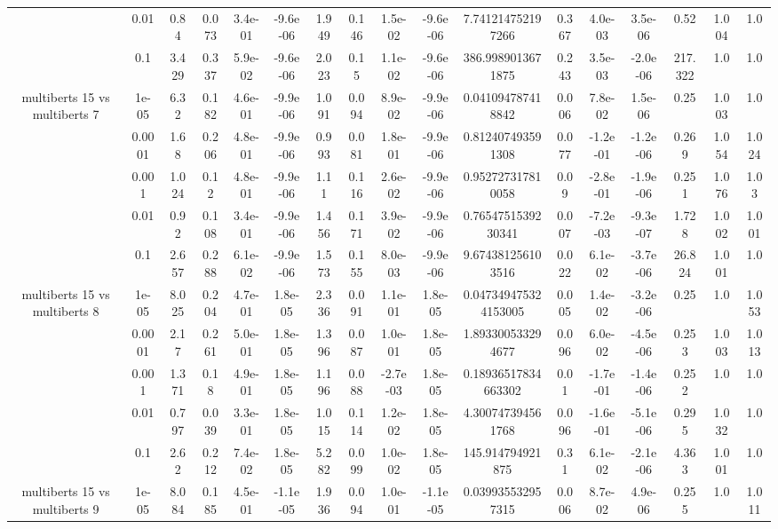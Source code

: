 \begin{tabular}{|c|c|c|c|c|c|c|c|c|c|c|c|c|c|c|c|c|}
 & 0.01 & 0.84 & 0.073 & 3.4e-01 & -9.6e-06 & 1.949 & 0.146 & 1.5e-02 & -9.6e-06 & 7.741214752197266 & 0.367 & 4.0e-03 & 3.5e-06 & 0.52 & 1.004 & 1.0 \\
 & 0.1 & 3.429 & 0.337 & 5.9e-02 & -9.6e-06 & 2.023 & 0.15 & 1.1e-02 & -9.6e-06 & 386.9989013671875 & 0.243 & 3.5e-03 & -2.0e-06 & 217.322 & 1.0 & 1.0 \\
\hline
\multirow{5}{*}{multiberts 15 vs multiberts 7} & 1e-05 & 6.32 & 0.182 & 4.6e-01 & -9.9e-06 & 1.091 & 0.094 & 8.9e-02 & -9.9e-06 & 0.041094787418842 & 0.006 & 7.8e-02 & 1.5e-06 & 0.25 & 1.003 & 1.0 \\
 & 0.0001 & 1.68 & 0.206 & 4.8e-01 & -9.9e-06 & 0.993 & 0.081 & 1.8e-01 & -9.9e-06 & 0.812407493591308 & 0.077 & -1.2e-01 & -1.2e-06 & 0.269 & 1.054 & 1.024 \\
 & 0.001 & 1.024 & 0.12 & 4.8e-01 & -9.9e-06 & 1.11 & 0.116 & 2.6e-02 & -9.9e-06 & 0.952727317810058 & 0.09 & -2.8e-01 & -1.9e-06 & 0.251 & 1.076 & 1.03 \\
 & 0.01 & 0.92 & 0.108 & 3.4e-01 & -9.9e-06 & 1.456 & 0.171 & 3.9e-02 & -9.9e-06 & 0.7654751539230341 & 0.007 & -7.2e-03 & -9.3e-07 & 1.728 & 1.002 & 1.001 \\
 & 0.1 & 2.657 & 0.288 & 6.1e-02 & -9.9e-06 & 1.573 & 0.155 & 8.0e-03 & -9.9e-06 & 9.674381256103516 & 0.022 & 6.1e-02 & -3.7e-06 & 26.824 & 1.001 & 1.0 \\
\hline
\multirow{5}{*}{multiberts 15 vs multiberts 8} & 1e-05 & 8.025 & 0.204 & 4.7e-01 & 1.8e-05 & 2.336 & 0.091 & 1.1e-01 & 1.8e-05 & 0.047349475324153005 & 0.005 & 1.4e-02 & -3.2e-06 & 0.25 & 1.0 & 1.053 \\
 & 0.0001 & 2.17 & 0.261 & 5.0e-01 & 1.8e-05 & 1.396 & 0.087 & 1.0e-01 & 1.8e-05 & 1.893300533294677 & 0.096 & 6.0e-02 & -4.5e-06 & 0.253 & 1.003 & 1.013 \\
 & 0.001 & 1.371 & 0.18 & 4.9e-01 & 1.8e-05 & 1.196 & 0.088 & -2.7e-03 & 1.8e-05 & 0.18936517834663302 & 0.01 & -1.7e-01 & -1.4e-06 & 0.252 & 1.0 & 1.0 \\
 & 0.01 & 0.797 & 0.039 & 3.3e-01 & 1.8e-05 & 1.015 & 0.114 & 1.2e-02 & 1.8e-05 & 4.300747394561768 & 0.096 & -1.6e-01 & -5.1e-06 & 0.295 & 1.032 & 1.0 \\
 & 0.1 & 2.62 & 0.212 & 7.4e-02 & 1.8e-05 & 5.282 & 0.099 & 1.0e-02 & 1.8e-05 & 145.914794921875 & 0.31 & 6.1e-02 & -2.1e-06 & 4.363 & 1.001 & 1.0 \\
\hline
\multirow{5}{*}{multiberts 15 vs multiberts 9} & 1e-05 & 8.084 & 0.185 & 4.5e-01 & -1.1e-05 & 1.936 & 0.094 & 1.0e-01 & -1.1e-05 & 0.039935532957315 & 0.006 & 8.7e-02 & 4.9e-06 & 0.255 & 1.0 & 1.011 \\

\end{tabular}
